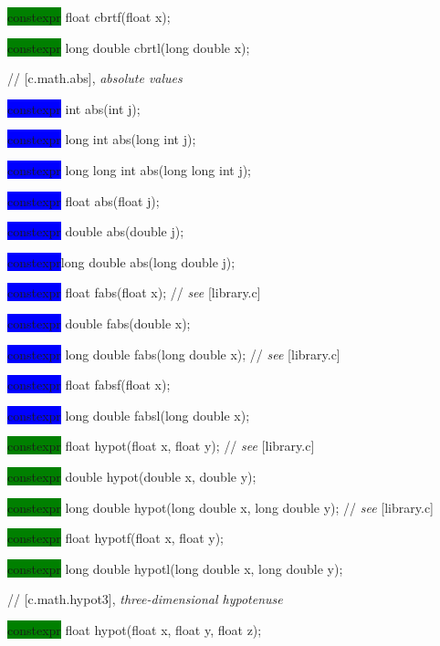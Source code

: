 \documentclass[prd,twocolumn,amsmath,amssymb,nofootinbib,eqsecnum]{revtex4-1}
\newcommand{\highlight}[1]{\colorbox{green}{\!\!\!\! #1}}
\newcommand{\oldhighlight}[1]{\colorbox{blue}{\!\!\!\! #1}}
\newcommand{\stdcomment}[1]{{// {\it see} [#1]}}
\begin{document}
{\highlight{constexpr} float cbrtf(float x);

\highlight{constexpr} long double cbrtl(long double x);

\vspace{2ex}

//  [c.math.abs], {\it absolute values}


\oldhighlight{constexpr} int abs(int j);

\oldhighlight{constexpr} long int abs(long int j);

\oldhighlight{constexpr} long long int abs(long long int j);

\oldhighlight{constexpr} float abs(float j);

\oldhighlight{constexpr} double abs(double j);

\oldhighlight{constexpr}long double abs(long double j);

\vspace{2ex}


\oldhighlight{constexpr} float fabs(float x); \stdcomment{library.c}

\oldhighlight{constexpr} double fabs(double x);

\oldhighlight{constexpr} long double fabs(long double x); \stdcomment{library.c}

\oldhighlight{constexpr} float fabsf(float x);

\oldhighlight{constexpr} long double fabsl(long double x);

\vspace{2ex}


\highlight{constexpr} float hypot(float x, float y); \stdcomment{library.c}

\highlight{constexpr} double hypot(double x, double y);

\highlight{constexpr} long double hypot(long double x, long double y); \stdcomment{library.c}

\highlight{constexpr} float hypotf(float x, float y);

\highlight{constexpr} long double hypotl(long double x, long double y);

\vspace{2ex}

// [c.math.hypot3], {\it three-dimensional hypotenuse}


\highlight{constexpr} float hypot(float x, float y, float z);

}
\end{document}
